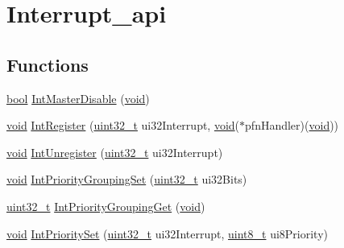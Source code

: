 \hypertarget{group__interrupt__api}{}\section{Interrupt\+\_\+api}
\label{group__interrupt__api}
\subsection*{Functions}
\begin{DoxyCompactItemize}
\item 
\hyperlink{_p_e___types_8h_a97a80ca1602ebf2303258971a2c938e2}{bool} \hyperlink{group__interrupt__api_gae3724c6b65b8461cf0441f09b13fadf5}{Int\+Master\+Disable} (\hyperlink{usb__devapi_8h_afabf60e7f57651d6d595a02c75f07cd0}{void})
\item 
\hyperlink{usb__devapi_8h_afabf60e7f57651d6d595a02c75f07cd0}{void} \hyperlink{group__interrupt__api_ga0a32aafea7f4904d2a64ee18b45f96c9}{Int\+Register} (\hyperlink{_p_e___types_8h_a33594304e786b158f3fb30289278f5af}{uint32\+\_\+t} ui32\+Interrupt, \hyperlink{usb__devapi_8h_afabf60e7f57651d6d595a02c75f07cd0}{void}($\ast$pfn\+Handler)(\hyperlink{usb__devapi_8h_afabf60e7f57651d6d595a02c75f07cd0}{void}))
\item 
\hyperlink{usb__devapi_8h_afabf60e7f57651d6d595a02c75f07cd0}{void} \hyperlink{group__interrupt__api_ga5dffc81c27c005f83e9bfc30f775982a}{Int\+Unregister} (\hyperlink{_p_e___types_8h_a33594304e786b158f3fb30289278f5af}{uint32\+\_\+t} ui32\+Interrupt)
\item 
\hyperlink{usb__devapi_8h_afabf60e7f57651d6d595a02c75f07cd0}{void} \hyperlink{group__interrupt__api_ga341c2244311b2c8c84b0a5546fc3dff1}{Int\+Priority\+Grouping\+Set} (\hyperlink{_p_e___types_8h_a33594304e786b158f3fb30289278f5af}{uint32\+\_\+t} ui32\+Bits)
\item 
\hyperlink{_p_e___types_8h_a33594304e786b158f3fb30289278f5af}{uint32\+\_\+t} \hyperlink{group__interrupt__api_ga86595146bc7ea51280d5abbb45fcf02a}{Int\+Priority\+Grouping\+Get} (\hyperlink{usb__devapi_8h_afabf60e7f57651d6d595a02c75f07cd0}{void})
\item 
\hyperlink{usb__devapi_8h_afabf60e7f57651d6d595a02c75f07cd0}{void} \hyperlink{group__interrupt__api_ga0432ddf52557352ac987f7dd211c2017}{Int\+Priority\+Set} (\hyperlink{_p_e___types_8h_a33594304e786b158f3fb30289278f5af}{uint32\+\_\+t} ui32\+Interrupt, \hyperlink{_p_e___types_8h_aba7bc1797add20fe3efdf37ced1182c5}{uint8\+\_\+t} ui8\+Priority)
\item 

\end{DoxyCompactItemize}
